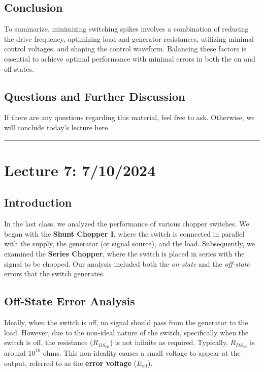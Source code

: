 \documentclass[a4paper,9pt,twoside,openany,twocolumn]{memoir}
\begin{document}
\subsection{Conclusion}

To summarize, minimizing switching spikes involves a combination of reducing the drive frequency, optimizing load and generator resistances, utilizing minimal control voltages, and shaping the control waveform. Balancing these factors is essential to achieve optimal performance with minimal errors in both the on and off states.

\subsection{Questions and Further Discussion}

If there are any questions regarding this material, feel free to ask. Otherwise, we will conclude today's lecture here.
\begin{center}\rule{0.5\linewidth}{0.5pt}\end{center}

\section*{Lecture 7: 7/10/2024}

\subsection{Introduction}
In the last class, we analyzed the performance of various chopper switches. We began with the \textbf{Shunt Chopper I}, where the switch is connected in parallel with the supply, the generator (or signal source), and the load. Subsequently, we examined the \textbf{Series Chopper}, where the switch is placed in series with the signal to be chopped. Our analysis included both the \textit{on-state} and the \textit{off-state} errors that the switch generates.

\subsection{Off-State Error Analysis}
Ideally, when the switch is off, no signal should pass from the generator to the load. However, due to the non-ideal nature of the switch, specifically when the switch is off, the resistance (\( R_{DS_{\text{off}}} \)) is not infinite as required. Typically, \( R_{DS_{\text{off}}} \) is around \(10^{10}\) ohms. This non-ideality causes a small voltage to appear at the output, referred to as the \textbf{error voltage} (\( E_{\text{off}} \)).
\end{document}
